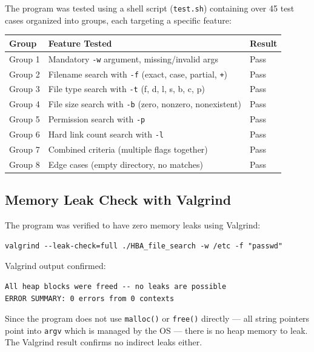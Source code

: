 \documentclass[12pt, a4paper]{article}
\begin{document}
The program was tested using a shell script (\texttt{test.sh}) containing over 45
test cases organized into groups, each targeting a specific feature:

\begin{center}
\begin{tabular}{lll}
\toprule
\textbf{Group} & \textbf{Feature Tested} & \textbf{Result} \\
\midrule
Group 1 & Mandatory \texttt{-w} argument, missing/invalid args & Pass \\
Group 2 & Filename search with \texttt{-f} (exact, case, partial, \texttt{+}) & Pass \\
Group 3 & File type search with \texttt{-t} (f, d, l, s, b, c, p) & Pass \\
Group 4 & File size search with \texttt{-b} (zero, nonzero, nonexistent) & Pass \\
Group 5 & Permission search with \texttt{-p} & Pass \\
Group 6 & Hard link count search with \texttt{-l} & Pass \\
Group 7 & Combined criteria (multiple flags together) & Pass \\
Group 8 & Edge cases (empty directory, no matches) & Pass \\
\bottomrule
\end{tabular}
\end{center}

\subsection{Memory Leak Check with Valgrind}

The program was verified to have zero memory leaks using Valgrind:

\begin{lstlisting}[style=bashstyle]
valgrind --leak-check=full ./HBA_file_search -w /etc -f "passwd"
\end{lstlisting}

Valgrind output confirmed:

\begin{lstlisting}[style=bashstyle]
All heap blocks were freed -- no leaks are possible
ERROR SUMMARY: 0 errors from 0 contexts
\end{lstlisting}

Since the program does not use \texttt{malloc()} or \texttt{free()} directly — all
string pointers point into \texttt{argv} which is managed by the OS — there is no
heap memory to leak. The Valgrind result confirms no indirect leaks either.
\end{document}
